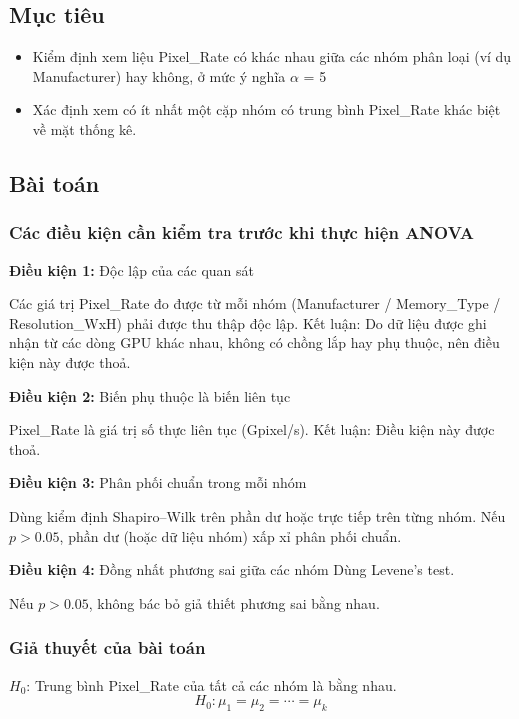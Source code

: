 \subsection{Mục tiêu}

\begin{itemize}
    \item Kiểm định xem liệu Pixel\_Rate có khác nhau giữa các nhóm phân loại (ví dụ Manufacturer) hay không, ở mức ý nghĩa $\alpha$ = 5%
    \item Xác định xem có ít nhất một cặp nhóm có trung bình Pixel\_Rate khác biệt về mặt thống kê.
\end{itemize}

\subsection{Bài toán}

\subsubsection{Các điều kiện cần kiểm tra trước khi thực hiện ANOVA}

\textbf{Điều kiện 1:} Độc lập của các quan sát

Các giá trị Pixel\_Rate đo được từ mỗi nhóm (Manufacturer / Memory\_Type / Resolution\_WxH) phải được thu thập độc lập.
Kết luận: Do dữ liệu được ghi nhận từ các dòng GPU khác nhau, không có chồng lắp hay phụ thuộc, nên điều kiện này được thoả.

\textbf{Điều kiện 2:} Biến phụ thuộc là biến liên tục

Pixel\_Rate là giá trị số thực liên tục (Gpixel/s).
Kết luận: Điều kiện này được thoả.

\textbf{Điều kiện 3:} Phân phối chuẩn trong mỗi nhóm

Dùng kiểm định Shapiro–Wilk trên phần dư hoặc trực tiếp trên từng nhóm.
Nếu $p>0.05$, phần dư (hoặc dữ liệu nhóm) xấp xỉ phân phối chuẩn.

\textbf{Điều kiện 4:} Đồng nhất phương sai giữa các nhóm
Dùng Levene’s test.

Nếu $p>0.05$, không bác bỏ giả thiết phương sai bằng nhau.

\subsubsection{Giả thuyết của bài toán}
$H_0$: Trung bình Pixel\_Rate của tất cả các nhóm là bằng nhau.
$$H_0: \mu_1 = \mu_2 = \cdots = \mu_k$$

